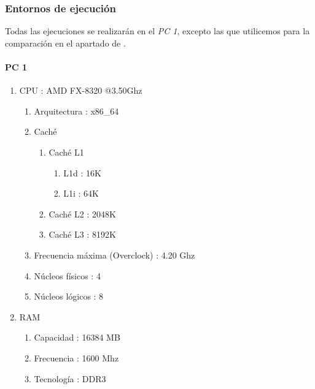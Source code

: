 \documentclass[12pt,spanish]{article}
\begin{document}
\subsubsection{Entornos de ejecución}
\label{sec:entorno}
Todas las ejecuciones se realizarán en el \emph{PC 1}, excepto las que utilicemos para la comparación en el apartado de \textit{}.
\paragraph{PC 1}
\label{sec:pc1}
\begin{enumerate}
 \item CPU : AMD FX-8320 @3.50Ghz
  \begin{enumerate}
    \item Arquitectura : x86\_64
 	\item Caché
 	\begin{enumerate}
 		 \item Caché L1
 		\begin{enumerate}
 			 \item L1d : 16K
			 \item L1i : 64K 
 		 \end{enumerate}
		 \item Caché L2 : 2048K
 		 \item Caché L3 : 8192K
 	\end{enumerate}
 	 \item Frecuencia máxima (Overclock) : 4.20 Ghz
	 \item Núcleos físicos : 4
	 \item Núcleos lógicos : 8
	\end{enumerate}
	\item RAM
	\begin{enumerate}
	\item Capacidad : 16384 MB
	\item Frecuencia : 1600 Mhz
 	\item Tecnología : DDR3
	\end{enumerate}
\end{enumerate}
\end{document}
